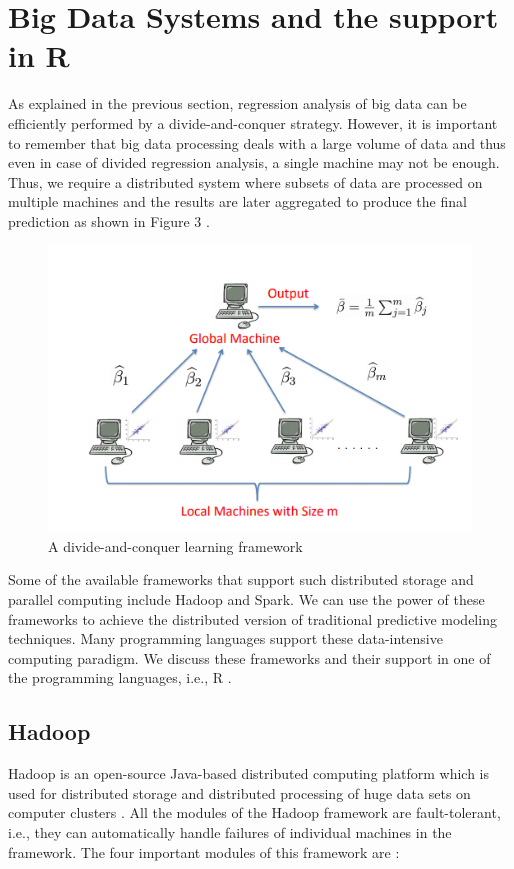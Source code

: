 \documentclass[sigconf]{acmart}
\begin{document}
\section{Big Data Systems and the support in R}
As explained in the previous section, regression analysis of big data can be efficiently performed by a divide-and-conquer strategy. However, it is important to remember that big data processing deals with a large volume of data and thus even in case of divided regression analysis, a single machine may not be enough. Thus, we require a distributed system where subsets of data are processed on multiple machines and the results are later aggregated to produce the final prediction as shown in Figure 3 \cite{dkr-reg}.
\begin{figure}[!ht]
  \centering\includegraphics[width=\columnwidth]{images/Fig3.png}
  \caption{A divide-and-conquer learning framework \cite{dkr-reg}}
  \label{Figure 3}
\end{figure}
Some of the available frameworks that support such distributed storage and parallel computing include Hadoop and Spark. We can use the power of these frameworks to achieve the distributed version of traditional predictive modeling techniques. Many programming languages support these data-intensive computing paradigm. We discuss these frameworks and their support in one of the programming languages, i.e., R \cite{log-reg}.

\subsection{Hadoop} 
Hadoop is an open-source Java-based distributed computing platform which is used for distributed storage and distributed processing of huge data sets on computer clusters \cite{log-reg}. All the modules of the Hadoop framework are fault-tolerant, i.e., they can automatically handle failures of individual machines in the framework. The four important modules of this framework are \cite{log-reg}:
\end{document}
